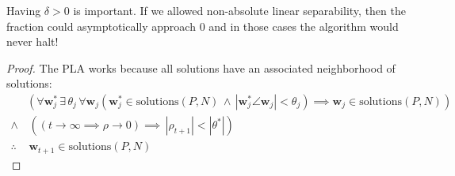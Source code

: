 \documentclass[12pt]{article}
\newcommand{\myvec}[1][v]{\mathbf{#1}}
\newcommand{\vecsub}[2]{\myvec[#1]_{#2}}
\newcommand{\vecsup}[2]{\myvec[#1]^{#2}}
\newcommand{\wsub}[1]{\vecsub{w}{#1}}
\newcommand{\wsubtt}{\wsub{t+1}}
\newcommand{\wfix}{\vecsup{w}{\ast}}
\begin{document}
Having $\delta > 0$ is important.  If we allowed non-absolute linear separability, then the fraction could asymptotically approach 0 and in those cases the algorithm would never halt!  \par

\begin{proof}
The PLA works because all solutions have an associated neighborhood of solutions:
\begin{align*}
&(\forall \wfix_{j} \, \exists \, \theta_{j} \, \forall \wsub{j}(\wfix_{j} \in \text{solutions}(P, N) \,\wedge\, |\wfix_{j} \angle \wsub{j}| < \theta_{j}) \implies \wsub{j} \in \text{solutions}(P, N)) \\
\wedge&\, ((t \rightarrow \infty \implies \rho \rightarrow 0)
\implies \,|\rho_{t+1}| < |\theta^{*}|)\\
\therefore&\,\wsubtt \in \text{solutions}(P,N)
\end{align*}
\end{proof}
\end{document}
